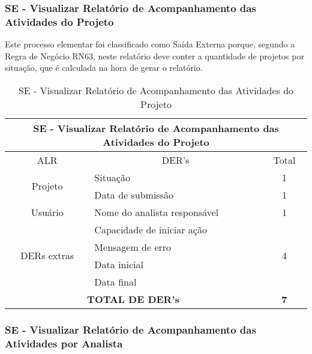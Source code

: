     \subsubsection{SE - Visualizar Relatório de Acompanhamento das Atividades do Projeto}
  
    Este processo elementar foi classificado como Saída Externa porque, segundo a Regra de Negócio RN63, neste relatório
    deve conter a quantidade de projetos por situação, que é calculada na hora de gerar o relatório.
    
      \begin{table}[!h]
      \centering
      \caption{SE - Visualizar Relatório de Acompanhamento das Atividades do Projeto}
      \label{se_visualizar_relatorio_acompanhamento}
      \begin{tabular}{|c|l|c|}
      \hline
      \multicolumn{3}{|c|}{SE - Visualizar Relatório de Acompanhamento das Atividades do Projeto} \\ \hline
      ALR                              & \multicolumn{1}{c|}{DER's}       & Total                 \\ \hline
      \multirow{2}{*}{Projeto}         & Situação                         & 1                     \\ \cline{2-3} 
				      & Data de submissão                & 1                     \\ \hline
      Usuário                          & Nome do analista responsável     & 1                     \\ \hline
      \multirow{4}{*}{DERs extras}     & Capacidade de iniciar ação       & \multirow{4}{*}{4}    \\ \cline{2-2}
				      & Mensagem de erro                 &                       \\ \cline{2-2}
				      & Data inicial                     &                       \\ \cline{2-2}
				      & Data final                       &                       \\ \hline
      \multicolumn{2}{|c|}{\textbf{TOTAL DE DER's}}                       & \textbf{7}            \\ \hline
      \end{tabular}
      \end{table}
    
  \subsubsection{SE - Visualizar Relatório de Acompanhamento das Atividades por Analista}
      

